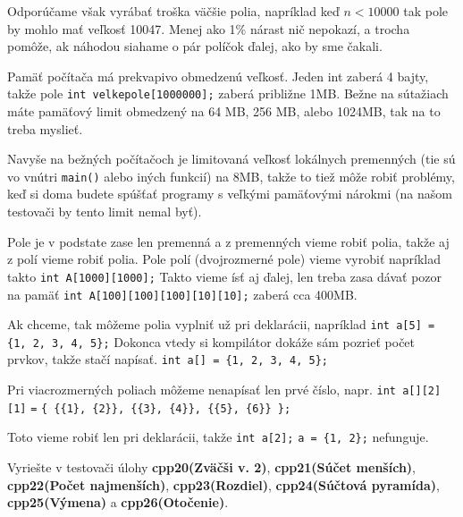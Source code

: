 Odporúčame však vyrábať troška väčšie polia, napríklad keď $n<10000$ tak pole
by mohlo mať veľkosť 10047. Menej ako 1\% nárast nič nepokazí, a trocha pomôže,
ak náhodou siahame o pár políčok ďalej, ako by sme čakali. 

Pamäť počítača má prekvapivo obmedzenú veľkosť. Jeden int zaberá 4 bajty, takže
pole \verb!int velkepole[1000000];! zaberá približne 1MB. Bežne na sútažiach
máte pamäťový limit obmedzený na 64 MB, 256 MB, alebo 1024MB, tak na to treba
myslieť.

Navyše na bežných počítačoch je limitovaná veľkosť lokálnych premenných (tie sú
vo vnútri \verb!main()! alebo iných funkcií) na 8MB, takže to tiež môže robiť
problémy, keď si doma budete spúšťať programy s veľkými pamäťovými nárokmi (na
našom testovači by tento limit nemal byť).

\medskip

Pole je v podstate zase len premenná a z premenných vieme robiť polia, takže aj
z polí vieme robiť polia. Pole polí (dvojrozmerné pole) vieme vyrobiť napríklad
takto \verb!int A[1000][1000];! Takto vieme ísť aj ďalej, len treba zasa dávať
pozor na pamäť \verb!int A[100][100][100][10][10];! zaberá cca 400MB.

\medskip

Ak chceme, tak môžeme polia vyplniť už pri deklarácii, napríklad 
\verb!int a[5] = {1, 2, 3, 4, 5};! Dokonca vtedy si kompilátor dokáže sám
pozrieť počet prvkov, takže stačí napísať. \verb!int a[] = {1, 2, 3, 4, 5};!

Pri viacrozmerných poliach môžeme nenapísať len prvé číslo, napr. 
\verb!int a[][2][1]! \verb!=! \verb!{ {{1}, {2}}, {{3}, {4}}, {{5}, {6}} };!

Toto vieme robiť len pri deklarácii, takže \verb!int a[2];! \verb!a = {1, 2};!
nefunguje.

\medskip

Vyriešte v testovači úlohy \textbf{cpp20(Zväčši v. 2)}, \textbf{cpp21(Súčet menších)},
\textbf{cpp22(Počet najmenších)}, \textbf{cpp23(Rozdiel)}, \textbf{cpp24(Súčtová pyramída)}, 
\textbf{cpp25(Výmena)} a \textbf{cpp26(Otočenie)}.




